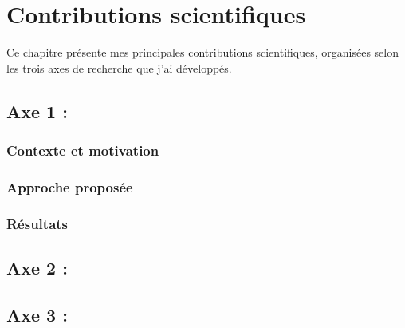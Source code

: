 
\chapter{Contributions scientifiques}
\label{ch:contributions}


Ce chapitre présente mes principales contributions scientifiques, organisées selon les
trois axes de recherche que j'ai développés.

\section{Axe 1 : }
\label{sec:contrib:axe1}


\subsection{Contexte et motivation}

\subsection{Approche proposée}

\subsection{Résultats}

\begin{contribution}
\end{contribution}

\section{Axe 2 : }
\label{sec:contrib:axe2}


\section{Axe 3 : }
\label{sec:contrib:axe3}

